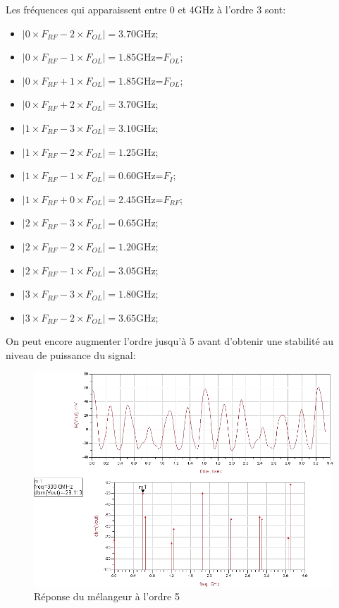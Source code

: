 \documentclass[10pt]{article}
\begin{document}
Les fréquences qui apparaissent entre 0 et 4GHz à l’ordre 3 sont:
\begin{itemize}
    \item $|0\times F_{RF}-2\times F_{OL}|=3.70$GHz;
    \item $|0\times F_{RF}-1\times F_{OL}|=1.85$GHz=$F_{OL}$;
    \item $|0\times F_{RF}+1\times F_{OL}|=1.85$GHz=$F_{OL}$;
    \item $|0\times F_{RF}+2\times F_{OL}|=3.70$GHz;
    \item $|1\times F_{RF}-3\times F_{OL}|=3.10$GHz;
    \item $|1\times F_{RF}-2\times F_{OL}|=1.25$GHz;
    \item $|1\times F_{RF}-1\times F_{OL}|=0.60$GHz=$F_I$;
    \item $|1\times F_{RF}+0\times F_{OL}|=2.45$GHz=$F_{RF}$;
    \item $|2\times F_{RF}-3\times F_{OL}|=0.65$GHz;
    \item $|2\times F_{RF}-2\times F_{OL}|=1.20$GHz;
    \item $|2\times F_{RF}-1\times F_{OL}|=3.05$GHz;
    \item $|3\times F_{RF}-3\times F_{OL}|=1.80$GHz;
    \item $|3\times F_{RF}-2\times F_{OL}|=3.65$GHz;
\end{itemize}

On peut encore augmenter l’ordre jusqu’à 5 avant d’obtenir une stabilité au niveau de puissance du signal:

\begin{figure}
    \begin{center}
        \includegraphics[width=15cm]{p8_simu_5}
    \end{center}
    \caption{Réponse du mélangeur à l’ordre 5}
\end{figure}
\end{document}

